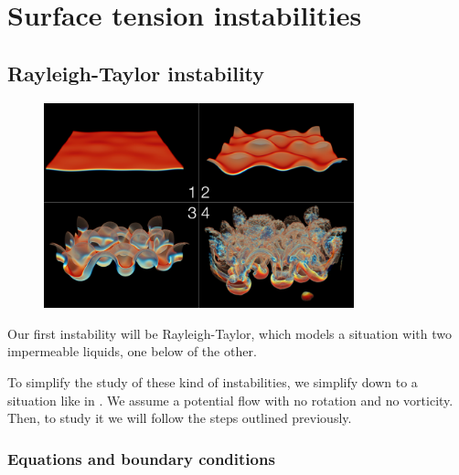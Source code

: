 \documentclass[palatino]{epflnotes}
\begin{document}
\chapter{Surface tension instabilities}

\section{Rayleigh-Taylor instability}

\begin{figure}[hbtp]
\begin{minipage}[b]{0.45\textwidth}
\centering
\includegraphics[width=0.8\textwidth]{img/RayleighTaylorInstability.png}
\label{fig:RayleighTaylorInterfaceImage}
\end{minipage}
\hfill
\begin{minipage}[b]{0.45\textwidth}
\label{fig:RayleighTaylorModel}
\end{minipage}
\end{figure}

Our first instability will be Rayleigh-Taylor, which models a situation with two impermeable liquids, one below of the other.

To simplify the study of these kind of instabilities, we simplify down to a situation like in . We assume a potential flow with no rotation and no vorticity. Then, to study it we will follow the steps outlined previously.

\subsection{Equations and boundary conditions}
\end{document}
